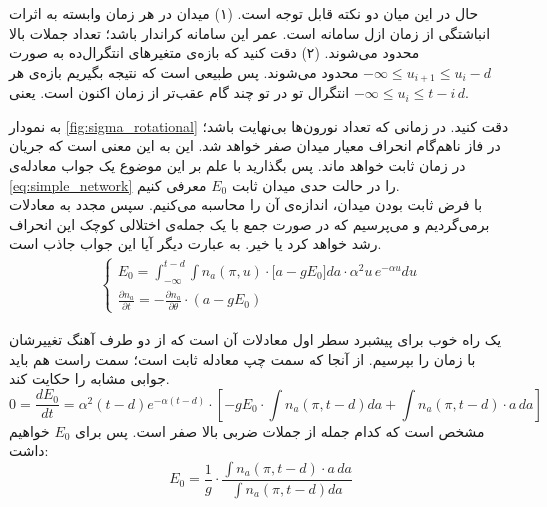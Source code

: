 \documentclass[12pt,onecolumn,a4paper]{article}
\begin{document}
حال در این میان دو نکته قابل توجه است. (۱) میدان در هر زمان وابسته به اثرات انباشتگی از زمان ازل سامانه است. عمر این سامانه کراندار باشد؛ تعداد جملات بالا محدود می‌شوند. (۲) دقت کنید که بازه‌ی متغیرهای انتگرال‌ده به صورت 
$- \infty \leq u_{i+1} \leq u_i - d$
محدود می‌شوند. پس طبیعی است که نتیجه بگیریم بازه‌ی هر انتگرال تو در تو چند گام عقب‌تر از زمان اکنون است. یعنی 
$- \infty \leq u_{i} \leq t - i \, d$.


به نمودار \ref{fig:sigma_rotational} دقت کنید. در زمانی که تعداد نورون‌ها بی‌نهایت باشد؛ در فاز ناهم‌گام انحراف معیار میدان صفر خواهد شد. این به این معنی است که جریان در زمان ثابت خواهد ماند. پس بگذارید با علم بر این موضوع یک جواب معادله‌ی \ref{eq:simple_network} را در حالت حدی میدان ثابت $E_0$ معرفی کنیم.\\
با فرض ثابت بودن میدان، اندازه‌ی آن را محاسبه می‌کنیم. سپس مجدد به معادلات برمی‌گردیم و می‌پرسیم که در صورت جمع با یک جمله‌ی اختلالی کوچک این انحراف رشد خواهد کرد یا خیر. به عبارت دیگر آیا این جواب جاذب است.\\
\begin{align}
\begin{cases}
E_0 = \int_{- \infty}^{t - d} \int n_a(\pi,u) \cdot \big[ a - g E_0 \big] da \cdot \alpha^2 u\, e^{-\alpha u} du \\
\frac{\partial n_a}{\partial t} = - \frac{\partial n_a}{\partial \theta} \cdot (a - g E_0 )
\end{cases}
\end{align}

یک راه خوب برای پیشبرد سطر اول معادلات آن است که از دو طرف آهنگ تغییرشان با زمان را بپرسیم. از آنجا که سمت چپ معادله ثابت است؛ سمت راست هم باید جوابی مشابه را حکایت کند.\\
\begin{equation}
0 = \frac{dE_0}{dt} = \alpha^2 (t-d) e^{-\alpha (t-d)} \cdot [ - gE_0 \cdot \int n_a(\pi,t-d) da + \int n_a(\pi,t-d)\cdot a\,da ]
\end{equation}
مشخص است که کدام جمله از جملات ضربی بالا صفر است. پس برای $E_0$ خواهیم داشت:
\begin{equation}
E_0 = \frac{1}{g}\cdot \frac{\int n_a(\pi,t-d)\cdot a\,da}{\int n_a(\pi,t-d) da }
\end{equation}
\end{document}
